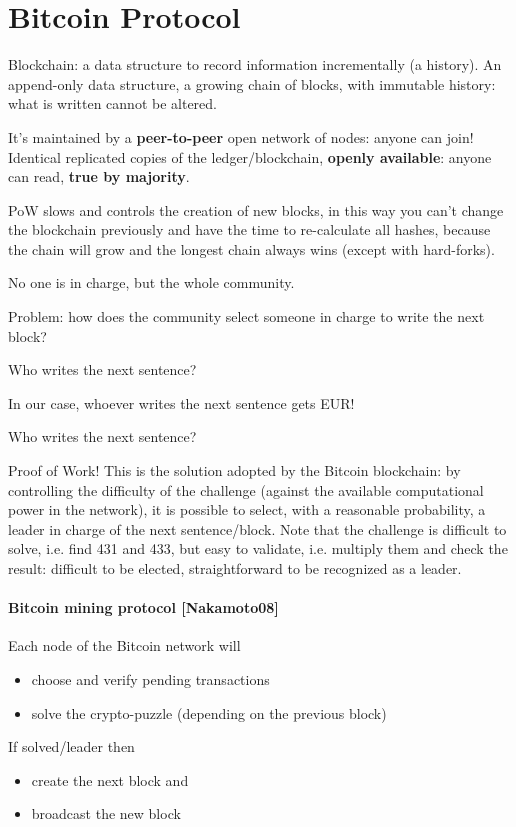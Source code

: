\section{Bitcoin Protocol}

Blockchain: a data structure to record information incrementally (a history). An append-only data structure, a growing chain of blocks, with immutable history: what is written cannot be altered.

It's maintained by a \textbf{peer-to-peer} open network of nodes: anyone can join! Identical replicated copies of the ledger/blockchain, \textbf{openly available}: anyone can read, \textbf{true by majority}.

PoW slows and controls the creation of new blocks, in this way you can't change the blockchain previously and have the time to re-calculate all hashes, because the chain will grow and the longest chain always wins (except with hard-forks).

No one is in charge, but the whole community.

Problem: how does the community select someone in charge to write the next block?

Who writes the next sentence?

In our case, whoever writes the next sentence gets  EUR!

Who writes the next sentence?

Proof of Work! This is the solution adopted by the Bitcoin blockchain: by controlling the difficulty of the challenge (against the available computational power in the network), it is possible to select, with a reasonable probability, a leader in charge of the next sentence/block. Note that the challenge is difficult to solve, i.e. find 431 and 433, but easy to validate, i.e. multiply them and check the result: difficult to be elected, straightforward to be recognized as a leader.

\paragraph*{Bitcoin mining protocol [Nakamoto08]}
Each node of the Bitcoin network will
\begin{itemize}
	\item choose and verify pending transactions
	\item solve the crypto-puzzle (depending on the previous block)
\end{itemize}

If solved/leader then
\begin{itemize}
	\item create the next block and
	\item broadcast the new block
\end{itemize}

